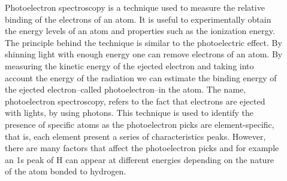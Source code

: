 \documentclass[main.tex]{subfiles}
\newcommand\chapterlabel{electrons}
\begin{document}
\begin{description}
\item[] 
Photoelectron spectroscopy is a technique used to measure the relative binding of the electrons of an atom. It is useful to experimentally obtain the energy levels of an atom and properties such as the ionization energy. The principle behind the technique is similar to the photoelectric effect. By shinning light with enough energy one can remove electrons of an atom. By measuring the kinetic energy of the ejected electron and taking into account the energy of the radiation we can estimate the binding energy of the ejected electron--called photoelectron--in the atom. The name, photoelectron spectroscopy, refers to the fact that electrons are ejected with lights, by using photons. This technique is used to identify the presence of specific atoms as the photoelectron picks are element-specific, that is, each element present a series of characteristics peaks. However, there are many factors that affect the photoelectron picks and for example an 1s peak of H can appear at different energies depending on the nature of the atom bonded to hydrogen. 
       \label{Fig:{\chapterlabel}\thefigurenewcounter}
\end{description}
\end{document}
